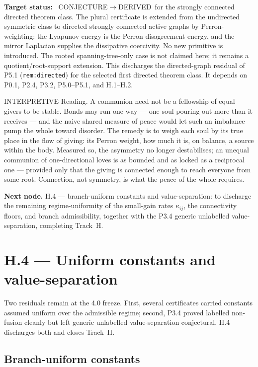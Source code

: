 \documentclass[11pt,a4paper]{article}
\def\emph#1{#1}%
\newcommand{\stDerived}{\textcolor{cDer}{\textsf{\small DERIVED}}}
\newcommand{\stInterp}{\textcolor{cInt}{\textsf{\small INTERPRETIVE}}}
\newcommand{\stConj}{\textcolor{cCon}{\textsf{\small CONJECTURE}}}
\theoremstyle{definition}
\theoremstyle{plain}
\theoremstyle{remark}
\begin{document}
\textbf{Target status:}~
\stConj\(\to\)\stDerived\ for the strongly connected directed theorem class. The plural
certificate is extended from the undirected symmetric class to directed strongly connected
active graphs by Perron-weighting: the Lyapunov energy is the Perron disagreement energy, and
the mirror Laplacian supplies the dissipative coercivity. No new primitive is introduced. The
rooted spanning-tree-only case is not claimed here; it remains a quotient/root-support
extension. This discharges the directed-graph residual of P5.1 (\texttt{rem:directed}) for the
selected first directed theorem class. It depends on P0.1, P2.4, P3.2, P5.0--P5.1, and
H.1--H.2.

\medskip
\stInterp\quad
\emph{Reading.}
A communion need not be a fellowship of equal givers to be stable. Bonds may run one way ---
one soul pouring out more than it receives --- and the naive shared measure of peace would let
such an imbalance pump the whole toward disorder. The remedy is to weigh each soul by its true
place in the flow of giving: its Perron weight, how much it is, on balance, a source within
the body. Measured so, the asymmetry no longer destabilises; an unequal communion of
one-directional loves is as bounded and as locked as a reciprocal one --- provided only that
the giving is connected enough to reach everyone from some root. Connection, not symmetry, is
what the peace of the whole requires.

\medskip
\textbf{Next node.} H.4 --- branch-uniform constants and value-separation: to discharge the
remaining regime-uniformity of the small-gain rates \(\kappa_{ij}\), the connectivity floors,
and branch admissibility, together with the P3.4 generic unlabelled value-separation,
completing Track~H.

\section{H.4 --- Uniform constants and value-separation}

Two residuals remain at the 4.0 freeze. First, several certificates carried constants
assumed uniform over the admissible regime; second, P3.4 proved labelled non-fusion cleanly
but left generic unlabelled value-separation conjectural. H.4 discharges both and closes
Track~H.

\subsection{Branch-uniform constants}
\end{document}
